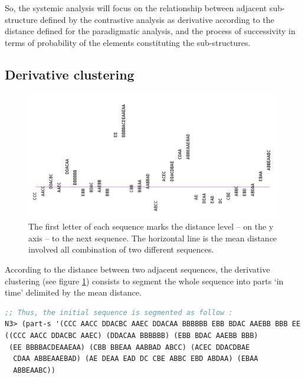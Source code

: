 \smallskip

So, the systemic analysis will focus on the relationship between adjacent sub-structure defined by the contrastive analysis as derivative according to the distance defined for the paradigmatic analysis, and the process of successivity in terms of probability of the elements constituting the sub-structures.

\subsection{Derivative clustering}

\begin{figure}[!hbt]
	\begin{center}
		\includegraphics[scale=0.38]{img/8701}
		\caption{The first letter of each sequence marks the distance level -- on the y axis -- to the next sequence. The horizontal line is the mean distance involved all combination of two different sequences.}
		\label{fig:der}
	\end{center}
\end{figure}	

According to the distance between two adjacent sequences, the derivative clustering (see figure \ref{fig:der}) consists to segment the whole sequence into parts `in time' delimited by the mean distance.
	
	\smallskip
		
\begin{lstlisting}[language=Lisp]
;; Thus, the initial sequence is segmented as follow :
N3> (part-s '(CCC AACC DDACBC AAEC DDACAA BBBBBB EBB BDAC AAEBB BBB EE BBBBACDEAAEAA CBB BBEAA AABBAD ABCC ACEC DDACDBAE CDAA ABBEAAEBAD AE DEAA EAD DC CBE ABBC EBD ABDAA EBAA ABBEAABC DBB))
((CCC AACC DDACBC AAEC) (DDACAA BBBBBB) (EBB BDAC AAEBB BBB) 
 (EE BBBBACDEAAEAA) (CBB BBEAA AABBAD ABCC) (ACEC DDACDBAE 
  CDAA ABBEAAEBAD) (AE DEAA EAD DC CBE ABBC EBD ABDAA) (EBAA 
  ABBEAABC))
\end{lstlisting}

